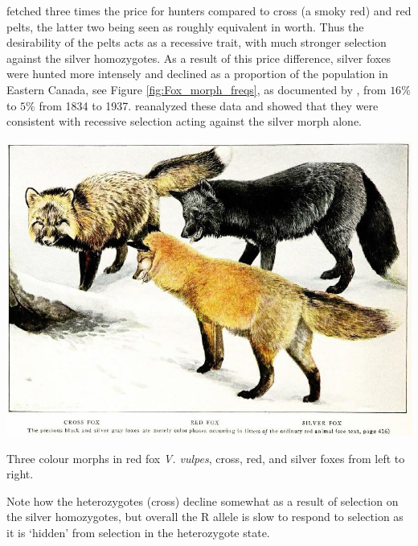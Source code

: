fetched three times the price for hunters compared to cross (a smoky red) and red
pelts, the latter two being seen as roughly equivalent in worth. Thus
the desirability of the pelts acts as a recessive trait, with much
stronger selection against the silver homozygotes.  As a
result of this price difference, silver foxes were hunted more
intensely and declined as a proportion of the population in Eastern Canada, see Figure
\ref{fig:Fox_morph_freqs}, as documented by \citeauthor{elton:42},
from $16\%$ to $5\%$ from 1834 to 1937.
\citeauthor{haldane:42} reanalyzed these data and showed that they
were consistent with recessive selection acting against the silver
morph alone. \begin{marginfigure}
\begin{center}
  \includegraphics[width = \textwidth]{illustration_images/single_locus_selection/fox_morphs/fox_morphs_silver_cross.png}
\end{center}
\caption{Three colour morphs in red fox {\it V. vulpes}, cross, red,
  and silver foxes from left to right. } \label{fig:Fox_morphs}
\end{marginfigure} Note how the heterozygotes (cross) decline somewhat as a
result of selection on the silver homozygotes, but overall the R
allele is slow to respond to selection as it is `hidden' from
selection in the heterozygote state.

